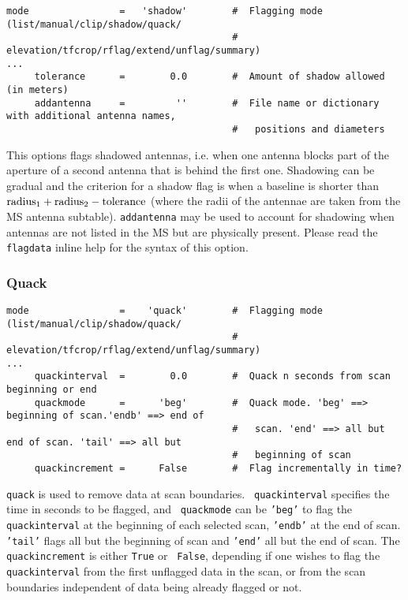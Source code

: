 \small
\begin{verbatim}
mode                =   'shadow'        #  Flagging mode (list/manual/clip/shadow/quack/
                                        #  elevation/tfcrop/rflag/extend/unflag/summary)
...
     tolerance      =        0.0        #  Amount of shadow allowed (in meters)
     addantenna     =         ''        #  File name or dictionary with additional antenna names,
                                        #   positions and diameters
\end{verbatim}

\normalsize 

This options flags shadowed antennas, i.e. when one antenna blocks
part of the aperture of a second antenna that is behind the first
one. Shadowing can be gradual and the criterion for a shadow flag is
when a baseline is shorter than ${\rm radius}_1 + {\rm radius}_2 - {\rm tolerance}$
(where the radii of the antennae are taken from the MS antenna
subtable). {\tt addantenna} may be used to account for shadowing when
antennas are not listed in the MS but are physically present. Please
read the {\tt flagdata} inline help for the syntax of this option.


\subsubsection{Quack}
\label{section:edit.flagdata.mode.quack}
\small
\begin{verbatim}
mode                =    'quack'        #  Flagging mode (list/manual/clip/shadow/quack/
                                        #   elevation/tfcrop/rflag/extend/unflag/summary)
...
     quackinterval  =        0.0        #  Quack n seconds from scan beginning or end
     quackmode      =      'beg'        #  Quack mode. 'beg' ==> beginning of scan.'endb' ==> end of
                                        #   scan. 'end' ==> all but end of scan. 'tail' ==> all but
                                        #   beginning of scan
     quackincrement =      False        #  Flag incrementally in time?
\end{verbatim}
\normalsize

{\tt quack} is used to remove data at scan boundaries. {\tt
  quackinterval} specifies the time in seconds to be flagged, and {\tt
  quackmode} can be {\tt 'beg'} to flag the {\tt quackinterval} at the
beginning of each selected scan, {\tt 'endb'} at the end of scan. {\tt
  'tail'} flags all but the beginning of scan and {\tt 'end'} all but
the end of scan. The {\tt quackincrement} is either {\tt True} or {\tt
  False}, depending if one wishes to flag the {\tt quackinterval} from
the first unflagged data in the scan, or from the scan boundaries
independent of data being already flagged or not.

